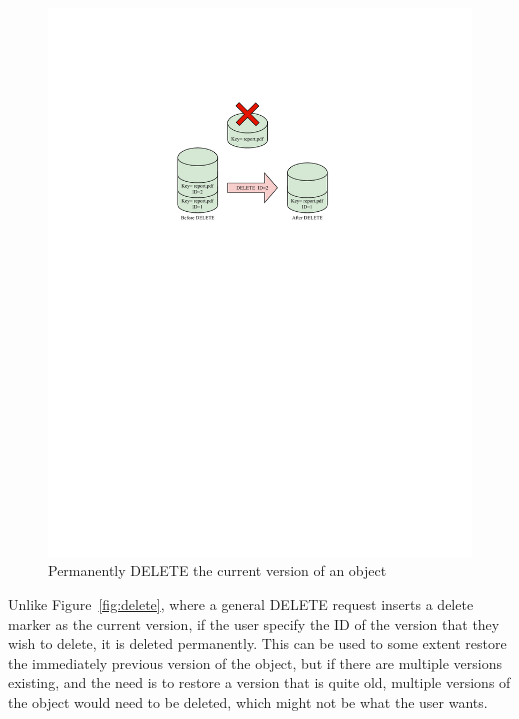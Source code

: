\documentclass{home_assignment}
\begin{document}
    \begin{figure}[H]
        \centering
        \includegraphics[scale=1.3]{../Figures/versioning_delete_permanent}
        \caption{Permanently DELETE the current version of an object}
        \label{fig:delete_permanent}
    \end{figure}
    Unlike Figure~\ref{fig:delete}, where a general DELETE request inserts a delete marker as the current version, if the user specify the ID of the version that they wish to delete, it is deleted permanently. This can be used to some extent restore the immediately previous version of the object, but if there are multiple versions existing, and the need is to restore a version that is quite old, multiple versions of the object would need to be deleted, which might not be what the user wants.
\end{document}

